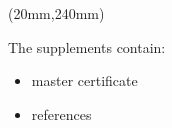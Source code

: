 \begin{textblock*}{290mm}(20mm,240mm)

The supplements contain:
\begin{itemize}
    \item master certificate
    \item references
\end{itemize}


\end{textblock*}

\newpage 